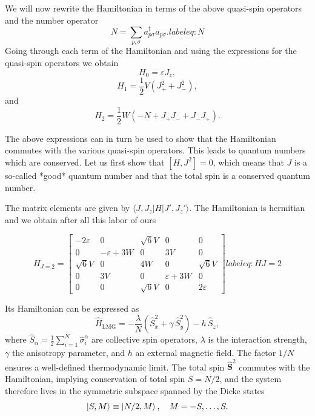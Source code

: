 \documentclass[twocolumn,superscriptaddress,unsortedaddress,nofootinbib,amsmath,amssymb,
aps,floatfix]{revtex4-2}
\begin{document}
We will now rewrite the Hamiltonian in terms of the above quasi-spin operators and the number operator 
\begin{equation}
N = \sum_{p,\sigma} a_{p\sigma}^\dagger a_{p\sigma}.
label{eq:N}
\end{equation}
Going through each term of the Hamiltonian and using the expressions for the quasi-spin operators we obtain
\begin{equation}
H_0 = \varepsilon J_z, 
\end{equation}
\begin{equation}
H_1 = \frac{1}{2} V \left( J_+^2 + J_-^2 \right),
\end{equation}
and 
\begin{equation}
H_2 = \frac{1}{2} W \left( -N + J_+ J_- + J_- J_+ \right).
\end{equation}

The above expressions can in turn be used to show that the Hamiltonian
commutes with the various quasi-spin operators. This leads to quantum
numbers which are conserved.  Let us first show that $[H,J^2]=0$,
which means that $J$ is a so-called *good* quantum number and that the
total spin is a conserved quantum number.

The matrix elements are given by $\langle J,J_z \vert H \vert J',J_z' \rangle$.
The
Hamiltonian is hermitian and we obtain after all this labor of ours

\begin{equation}
H_{J = 2} =
\begin{bmatrix}
-2\varepsilon & 0 & \sqrt{6}V & 0 & 0 \\
0 & -\varepsilon + 3W & 0 & 3V & 0 \\
\sqrt{6}V & 0 & 4W & 0 & \sqrt{6}V \\
0 & 3V & 0 & \varepsilon + 3W & 0 \\
0 & 0 & \sqrt{6}V & 0 & 2\varepsilon
\end{bmatrix}
label{eq:HJ=2}
\end{equation}





Its Hamiltonian can be expressed as
\begin{equation}
  \hat{H}_{\mathrm{LMG}} = -\frac{\lambda}{N} \left( \hat{S}_x^2 + \gamma\, \hat{S}_y^2 \right)
  - h\, \hat{S}_z,
  \label{eq:lmg-hamiltonian}
\end{equation}
where $\hat{S}_\alpha = \tfrac{1}{2}\sum_{i=1}^N \hat{\sigma}_i^\alpha$ are collective spin operators,
$\lambda$ is the interaction strength, $\gamma$ the anisotropy parameter, and $h$ an external magnetic field.
The factor $1/N$ ensures a well-defined thermodynamic limit.
The total spin $\hat{\mathbf{S}}^2$ commutes with the Hamiltonian, implying conservation of total spin $S = N/2$,
and the system therefore lives in the symmetric subspace spanned by the Dicke states
\begin{equation}
  \ket{S, M} \equiv \ket{N/2, M}, \quad M = -S, \ldots, S.
\end{equation}
\end{document}
